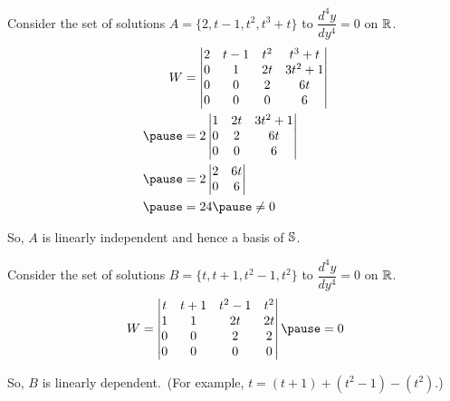 \documentclass{beamer}
\begin{document}
\begin{frame}
\begin{example}
Consider the set of solutions $A=\{2,t-1,t^2,t^3+t\}$ to $\dfrac{d^4y}{dy^4}=0$ on $\mathbb{R}$.\pause
\begin{equation*}
\begin{aligned}
W &=
\begin{vmatrix}
2 & t-1 & t^2 & t^3+t  \\
0 & 1   & 2t  & 3t^2+1 \\
0 & 0   & 2   & 6t     \\
0 & 0   & 0   & 6      \\
\end{vmatrix}\\\pause
&=2
\begin{vmatrix}
1   & 2t  & 3t^2+1 \\
0   & 2   & 6t     \\
0   & 0   & 6      \\
\end{vmatrix}\\\pause
&=2
\begin{vmatrix}
2   & 6t     \\
0   & 6      \\
\end{vmatrix}\\\pause
&=24\pause
\neq0
\end{aligned}
\end{equation*}

\vspace{-3mm}
So, $A$ is linearly independent and hence a basis of $\mathbb{S}$.
\end{example}
\end{frame}

\begin{frame}
\begin{example}
Consider the set of solutions $B=\{t,t+1,t^2-1,t^2\}$ to $\dfrac{d^4y}{dy^4}=0$ on $\mathbb{R}$.\pause
\begin{equation*}
W =
\begin{vmatrix}
t & t+1 & t^2 -1 & t^2  \\
1 & 1   & 2t     & 2t   \\
0 & 0   & 2      & 2    \\
0 & 0   & 0      & 0    \\
\end{vmatrix}\pause
=0
\end{equation*}

\vspace{-3mm}
So, $B$ is linearly dependent.\pause\ (For example, $t=(t+1)+(t^2-1)-(t^2)$.)
\end{example}
\end{frame}
\end{document}

